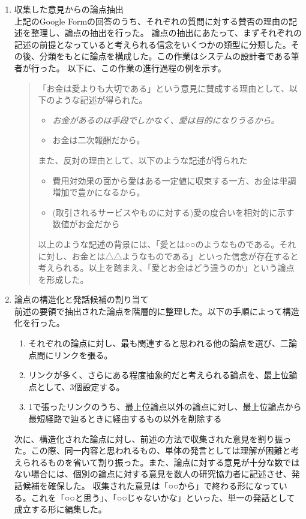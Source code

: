 \documentclass[11pt, a4paper]{jreport} %
\begin{document}
\begin{enumerate}
\item 収集した意見からの論点抽出\\
上記のGoogle Formの回答のうち、それぞれの質問に対する賛否の理由の記述を整理し、論点の抽出を行った。
論点の抽出にあたって、まずそれぞれの記述の前提となっていると考えられる信念をいくつかの類型に分類した。その後、分類をもとに論点を構成した。この作業はシステムの設計者である筆者が行った。
以下に、この作業の進行過程の例を示す。
\begin{quote}
「お金は愛よりも大切である」という意見に賛成する理由として、以下のような記述が得られた。
\begin{itemize}
\item \textsl{お金があるのは手段でしかなく、愛は目的になりうるから。}
\item お金は二次報酬だから。
\end{itemize}
また、反対の理由として、以下のような記述が得られた
\begin{itemize}
\item 費用対効果の面から愛はある一定値に収束する一方、お金は単調増加で豊かになるから。
\item (取引されるサービスやものに対する)愛の度合いを相対的に示す数値がお金だから
\end{itemize}


以上のような記述の背景には、「愛とは○○のようなものである。それに対し、お金とは△△ようなものである」といった信念が存在すると考えられる。以上を踏まえ、「愛とお金はどう違うのか」という論点を形成した。
\end{quote}

\item  論点の構造化と発話候補の割り当て\\
前述の要領で抽出された論点を階層的に整理した。以下の手順によって構造化を行った。
\begin{enumerate}
\renewcommand{\labelenumii}{(\arabic{enumii}).}
\item それぞれの論点に対し、最も関連すると思われる他の論点を選び、二論点間にリンクを張る。
\item リンクが多く、さらにある程度抽象的だと考えられる論点を、最上位論点として、3個設定する。
\item 1で張ったリンクのうち、最上位論点以外の論点に対し、最上位論点から最短経路で辿るときに経由するもの以外を削除する
\end{enumerate}


次に、構造化された論点に対し、前述の方法で収集された意見を割り振った。この際、同一内容と思われるもの、単体の発言としては理解が困難と考えられるものを省いて割り振った。また、論点に対する意見が十分な数ではない場合には、個別の論点に対する意見を数人の研究協力者に記述させ、発話候補を確保した。
収集された意見は「○○から」で終わる形になっている。これを「○○と思う」、「○○じゃないかな」といった、単一の発話として成立する形に編集した。




\end{enumerate}
\end{document}
